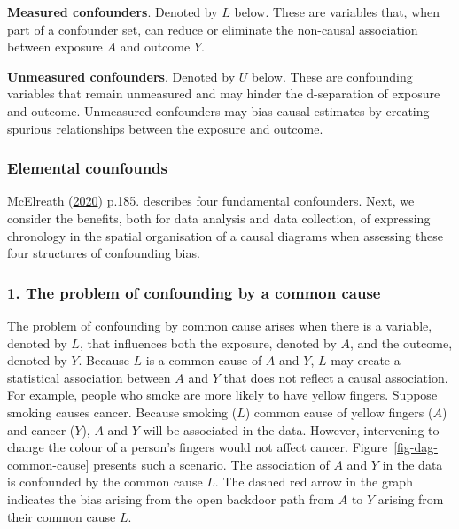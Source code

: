 \documentclass[
  singlecolumn]{article}
\begin{document}
\textbf{Measured confounders}. Denoted by \(L\) below. These are
variables that, when part of a confounder set, can reduce or eliminate
the non-causal association between exposure \(A\) and outcome \(Y\).

\textbf{Unmeasured confounders}. Denoted by \(U\) below. These are
confounding variables that remain unmeasured and may hinder the
d-separation of exposure and outcome. Unmeasured confounders may bias
causal estimates by creating spurious relationships between the exposure
and outcome.

\hypertarget{elemental-counfounds}{%
\subsubsection{Elemental counfounds}\label{elemental-counfounds}}

McElreath (\protect\hyperlink{ref-mcelreath2020}{2020}) p.185. describes
four fundamental confounders. Next, we consider the benefits, both for
data analysis and data collection, of expressing chronology in the
spatial organisation of a causal diagrams when assessing these four
structures of confounding bias.

\hypertarget{the-problem-of-confounding-by-a-common-cause}{%
\subsubsection{1. The problem of confounding by a common
cause}\label{the-problem-of-confounding-by-a-common-cause}}

The problem of confounding by common cause arises when there is a
variable, denoted by \(L\), that influences both the exposure, denoted
by \(A\), and the outcome, denoted by \(Y.\) Because \(L\) is a common
cause of \(A\) and \(Y\), \(L\) may create a statistical association
between \(A\) and \(Y\) that does not reflect a causal association. For
example, people who smoke are more likely to have yellow fingers.
Suppose smoking causes cancer. Because smoking (\(L\)) common cause of
yellow fingers (\(A\)) and cancer (\(Y\)), \(A\) and \(Y\) will be
associated in the data. However, intervening to change the colour of a
person's fingers would not affect cancer.
Figure~\ref{fig-dag-common-cause} presents such a scenario. The
association of \(A\) and \(Y\) in the data is confounded by the common
cause \(L\). The dashed red arrow in the graph indicates the bias
arising from the open backdoor path from \(A\) to \(Y\) arising from
their common cause \(L\).
\end{document}
